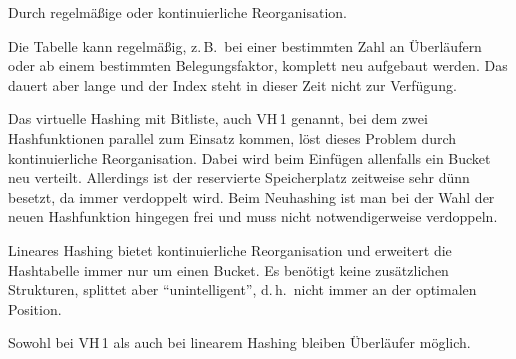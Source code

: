 \begin{enumerate}[a)]
\begin{solution}
Durch regelmäßige oder kontinuierliche Reorganisation.

Die Tabelle kann regelmäßig, z.\,B.\ bei einer bestimmten Zahl an Überläufern oder ab einem bestimmten Belegungsfaktor, komplett neu aufgebaut werden. Das dauert aber lange und der Index steht in dieser Zeit nicht zur Verfügung.

Das virtuelle Hashing mit Bitliste, auch VH\,1 genannt, bei dem zwei Hashfunktionen parallel zum Einsatz kommen, löst dieses Problem durch kontinuierliche Reorganisation. Dabei wird beim Einfügen allenfalls ein Bucket neu verteilt. Allerdings ist der reservierte Speicherplatz zeitweise sehr dünn besetzt, da immer verdoppelt wird. Beim Neuhashing ist man bei der Wahl der neuen Hashfunktion hingegen frei und muss nicht notwendigerweise verdoppeln.

Lineares Hashing bietet kontinuierliche Reorganisation und erweitert die Hashtabelle immer nur um einen Bucket.
Es benötigt keine zusätzlichen Strukturen, splittet aber "`unintelligent"', d.\,h.\ nicht immer an der optimalen Position.

Sowohl bei VH\,1 als auch bei linearem Hashing bleiben Überläufer möglich.
\end{solution}

\end{enumerate}

